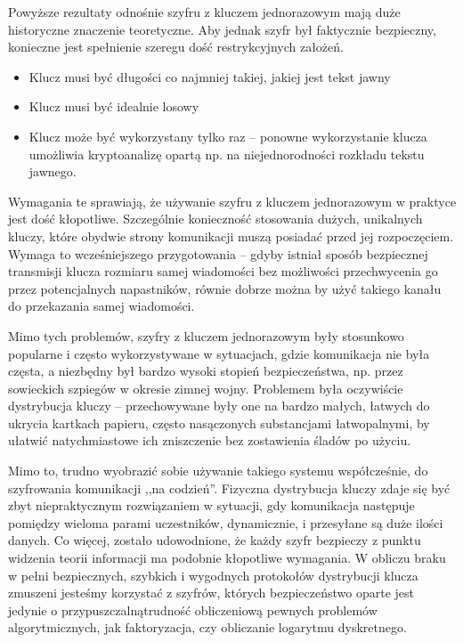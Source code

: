 \documentclass[10pt]{article}
\begin{document}
Powyższe rezultaty odnośnie szyfru z kluczem jednorazowym mają duże historyczne znaczenie teoretyczne.
Aby jednak szyfr był faktycznie bezpieczny, konieczne jest spełnienie szeregu dość restrykcyjnych
założeń.

\begin{itemize}
  \item Klucz musi być długości co najmniej takiej, jakiej jest tekst jawny
  \item Klucz musi być idealnie losowy
  \item Klucz może być wykorzystany tylko raz -- ponowne wykorzystanie klucza umożliwia kryptoanalizę
    opartą np. na niejednorodności rozkładu tekstu jawnego\footnotemark.
\end{itemize}


Wymagania te sprawiają, że używanie szyfru z kluczem jednorazowym w praktyce jest dość kłopotliwe.
Szczególnie konieczność stosowania dużych, unikalnych kluczy, które obydwie strony komunikacji muszą
posiadać przed jej rozpoczęciem. Wymaga to wcześniejszego przygotowania -- gdyby istniał sposób
bezpiecznej transmisji klucza rozmiaru samej wiadomości bez możliwości przechwycenia go przez 
potencjalnych napastników, równie dobrze można by użyć takiego kanału do przekazania samej wiadomości.

Mimo tych problemów, szyfry z kluczem jednorazowym były stosunkowo popularne i często wykorzystywane
w sytuacjach, gdzie komunikacja nie była częsta, a niezbędny był bardzo wysoki stopień bezpieczeństwa,
np. przez sowieckich szpiegów w okresie zimnej wojny. Problemem była oczywiście dystrybucja kluczy
-- przechowywane były one na bardzo małych, łatwych do ukrycia kartkach papieru, często nasączonych
substancjami łatwopalnymi, by ułatwić natychmiastowe ich zniszczenie bez zostawienia śladów po użyciu.

Mimo to, trudno wyobrazić sobie używanie takiego systemu współcześnie, do szyfrowania komunikacji
,,na codzień''. Fizyczna dystrybucja kluczy zdaje się być zbyt niepraktycznym rozwiązaniem w sytuacji,
gdy komunikacja następuje pomiędzy wieloma parami uczestników, dynamicznie, i przesyłane są duże
ilości danych. Co więcej, zostało udowodnione\cite{Shannon49}, że każdy szyfr bezpieczy z punktu
widzenia teorii informacji ma podobnie kłopotliwe wymagania. W obliczu braku w pełni bezpiecznych,
szybkich i wygodnych protokołów dystrybucji klucza zmuszeni jesteśmy korzystać z szyfrów, których
bezpieczeństwo oparte jest jedynie o przypuszczalną\footnotemark trudność obliczeniową pewnych 
problemów algorytmicznych, jak faktoryzacja, czy obliczanie logarytmu dyskretnego.
\end{document}
